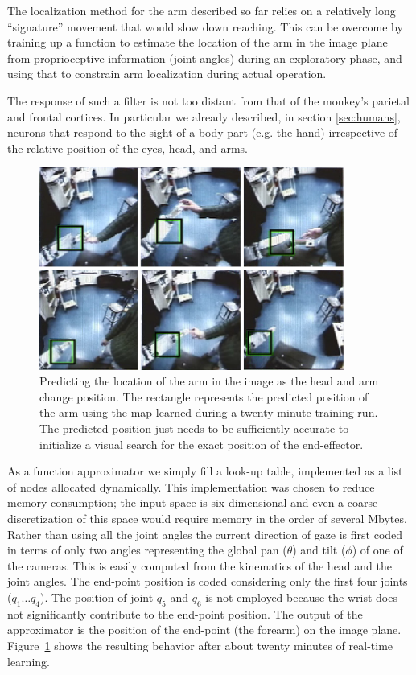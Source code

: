 The localization method for the arm described so far relies on a
relatively long ``signature'' movement that would slow down reaching.
This can be overcome by training up a function to estimate the
location of the arm in the image plane from proprioceptive information
(joint angles) during an exploratory phase, and using that to 
constrain arm localization during actual operation.

\ifrev
The response of such a filter is not too distant from that of the 
monkey's parietal and frontal cortices. In particular we already described, 
in section \ref{sec:humans}, neurons that respond to the sight of a 
body part (e.g. the hand) irrespective of the relative position 
of the eyes, head, and arms.
\fi

\begin{figure}[tbh]
\begin{center}
\includegraphics[width=10cm]{predict-position.eps}
\caption{ 
\label{fig:predict-position}
%
Predicting the location of the arm in the image as the head and arm
change position. The rectangle represents the predicted position of
the arm using the map learned during a twenty-minute training run.
The predicted position just needs to be sufficiently accurate to
initialize a visual search for the exact position of the end-effector.
%
}
\end{center}
\end{figure}


As a function approximator we simply fill a look-up table, implemented
as a list of nodes allocated dynamically. This implementation
was chosen to reduce memory consumption; the input space is six
dimensional and even a coarse discretization of this space would require
memory in the order of several Mbytes. Rather than using all the joint angles
the current direction of gaze is first coded in terms of only two angles
representing the global pan ($\theta$) and tilt ($\phi$) of one of the cameras.
This is easily computed from the kinematics of the head and the joint angles.
The end-point position is coded considering only the first four joints 
($q_1\ldots q_4$). The position of joint $q_5$ and $q_6$ is not employed because 
the wrist does not significantly contribute to the end-point position.
The output of the approximator is the position of the end-point (the forearm) on
the image plane. Figure~\ref{fig:predict-position} shows the resulting behavior
after about twenty minutes of real-time learning. 

